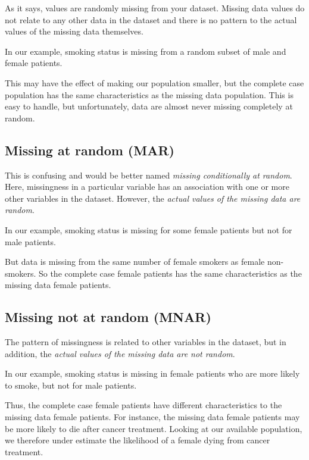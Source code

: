 \documentclass[
  12pt,
  krantz2]{krantz}
\begin{document}
As it says, values are randomly missing from your dataset.
Missing data values do not relate to any other data in the dataset and there is no pattern to the actual values of the missing data themselves.

In our example, smoking status is missing from a random subset of male and female patients.

This may have the effect of making our population smaller, but the complete case population has the same characteristics as the missing data population.
This is easy to handle, but unfortunately, data are almost never missing completely at random.

\hypertarget{missing-at-random-mar}{%
\subsection{Missing at random (MAR)}\label{missing-at-random-mar}}

This is confusing and would be better named \emph{missing conditionally at random}.
Here, missingness in a particular variable has an association with one or more other variables in the dataset.
However, the \emph{actual values of the missing data are random}.

In our example, smoking status is missing for some female patients but not for male patients.

But data is missing from the same number of female smokers as female non-smokers.
So the complete case female patients has the same characteristics as the missing data female patients.

\hypertarget{missing-not-at-random-mnar}{%
\subsection{Missing not at random (MNAR)}\label{missing-not-at-random-mnar}}

The pattern of missingness is related to other variables in the dataset, but in addition, the \emph{actual values of the missing data are not random}.

In our example, smoking status is missing in female patients who are more likely to smoke, but not for male patients.

Thus, the complete case female patients have different characteristics to the missing data female patients.
For instance, the missing data female patients may be more likely to die after cancer treatment.
Looking at our available population, we therefore under estimate the likelihood of a female dying from cancer treatment.
\end{document}
